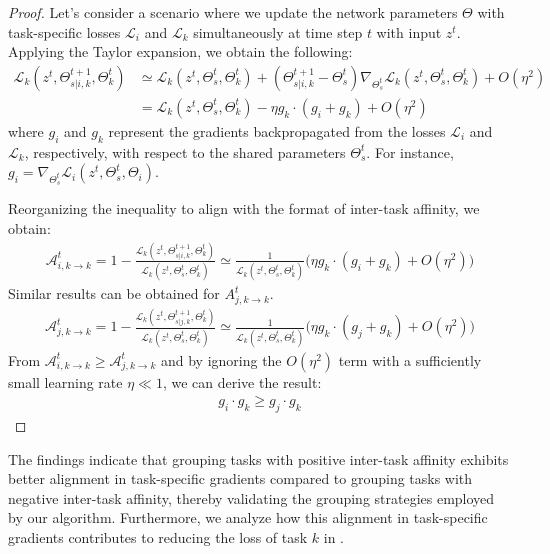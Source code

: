 \theomone*
\begin{proof}
Let's consider a scenario where we update the network parameters $\Theta$ with task-specific losses $\mathcal{L}_i$ and $\mathcal{L}_k$ simultaneously at time step $t$ with input $z^t$. Applying the Taylor expansion, we obtain the following:
\begin{align}
    \mathcal{L}_k(z^t, \Theta_{s|i,k}^{t+1}, \Theta_k^{t})
    &\simeq \mathcal{L}_k (z^t, \Theta_s^t, \Theta_k^t) + (\Theta_{s|i,k}^{t+1} - \Theta_s^t) \nabla_{\Theta_s^t} \mathcal{L}_k (z^t, \Theta_s^t, \Theta_k^t) + O(\eta^2) \\
    &= \mathcal{L}_k (z^t, \Theta_{s}^{t}, \Theta_k^{t})-\eta g_k\cdot(g_i+g_k) + O(\eta^2)
\end{align}
where $g_i$ and $g_k$ represent the gradients backpropagated from the losses $\mathcal{L}_i$ and $\mathcal{L}_k$, respectively, with respect to the shared parameters $\Theta_s^t$. For instance, $g_i = \nabla_{\Theta_s^t} \mathcal{L}_i (z^t, \Theta_s^t, \Theta_i)$.

Reorganizing the inequality to align with the format of inter-task affinity, we obtain:  
\begin{align}
    \mathcal{A}_{i,k\rightarrow k}^t = 1-\frac{\mathcal{L}_k(z^t, \Theta_{s|i,k}^{t+1}, \Theta_k^{t})}{\mathcal{L}_k (z^t, \Theta_{s}^t, \Theta_k^{t})} \simeq \frac{1}{\mathcal{L}_k (z^t, \Theta_{s}^t, \Theta_k^{t})}\biggl(\eta g_k\cdot(g_i+g_k) + O(\eta^2)\biggr)
\end{align}
Similar results can be obtained for $A_{j,k\rightarrow k}^t$.
\begin{align}
    \mathcal{A}_{j,k\rightarrow k}^t = 1-\frac{\mathcal{L}_k(z^t, \Theta_{s|j,k}^{t+1}, \Theta_k^{t})}{\mathcal{L}_k (z^t, \Theta_{s}^t, \Theta_k^{t})} \simeq \frac{1}{\mathcal{L}_k (z^t, \Theta_{s}^t, \Theta_k^{t})}\biggl(\eta g_k\cdot(g_j+g_k) + O(\eta^2)\biggr)
\end{align}
From $\mathcal{A}_{i,k \rightarrow k}^t \geq \mathcal{A}_{j,k \rightarrow k}^t$ and by ignoring the $O(\eta^2)$ term with a sufficiently small learning rate $\eta \ll 1$, we can derive the result:
\begin{align}
    g_i \cdot g_k \geq g_j \cdot g_k
\end{align}
\end{proof}
The findings indicate that grouping tasks with positive inter-task affinity exhibits better alignment in task-specific gradients compared to grouping tasks with negative inter-task affinity, thereby validating the grouping strategies employed by our algorithm. Furthermore, we analyze how this alignment in task-specific gradients contributes to reducing the loss of task $k$ in .



